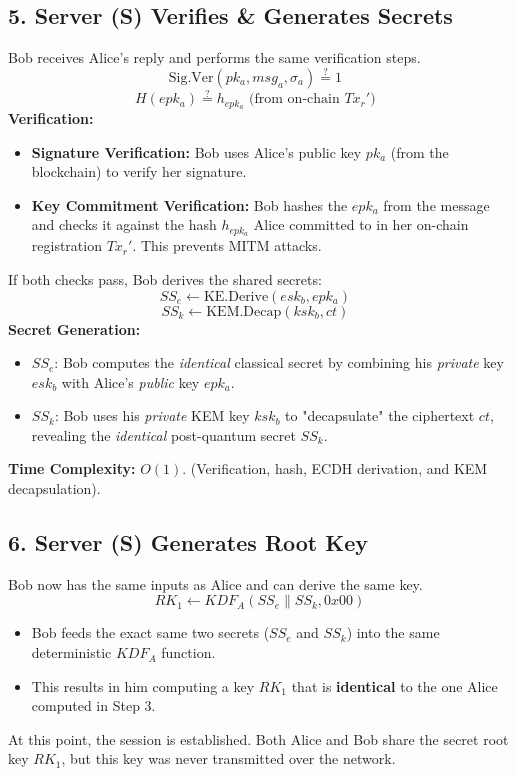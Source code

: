 \documentclass[12pt]{article}
\begin{document}
\subsection*{5. Server (S) Verifies \& Generates Secrets}
Bob receives Alice's reply and performs the same verification steps.
\[
\text{Sig.Ver}(pk_a, msg_a, \sigma_a) \stackrel{?}{=} 1 \text{ }
\]
\[
H(epk_a) \stackrel?{=} h_{epk_a} \text{ (from on-chain } Tx_r') \text{ }
\]
\textbf{Verification:}
\begin{itemize}
    \item \textbf{Signature Verification:} Bob uses Alice's public key \(pk_a\) (from the blockchain) to verify her signature.
    \item \textbf{Key Commitment Verification:} Bob hashes the \(epk_a\) from the message and checks it against the hash \(h_{epk_a}\) Alice committed to in her on-chain registration \(Tx_r'\). This prevents MITM attacks.
\end{itemize}
If both checks pass, Bob derives the shared secrets:
\[
SS_e \leftarrow \text{KE.Derive}(esk_b, epk_a) \text{ }
\]
\[
SS_k \leftarrow \text{KEM.Decap}(ksk_b, ct) \text{ }
\]
\textbf{Secret Generation:}
\begin{itemize}
    \item \textbf{\(SS_e\)}: Bob computes the \textit{identical} classical secret by combining his \textit{private} key \(esk_b\) with Alice's \textit{public} key \(epk_a\).
    \item \textbf{\(SS_k\)}: Bob uses his \textit{private} KEM key \(ksk_b\) to "decapsulate" the ciphertext \(ct\), revealing the \textit{identical} post-quantum secret \(SS_k\).
\end{itemize}
\textbf{Time Complexity:} \( O(1) \). (Verification, hash, ECDH derivation, and KEM decapsulation).

\subsection*{6. Server (S) Generates Root Key}
Bob now has the same inputs as Alice and can derive the same key.
\[
RK_1 \leftarrow KDF_A(SS_e \parallel SS_k, 0x00)
\]
\begin{itemize}
    \item Bob feeds the exact same two secrets (\(SS_e\) and \(SS_k\)) into the same deterministic \(KDF_A\) function.
    \item This results in him computing a key \(RK_1\) that is \textbf{identical} to the one Alice computed in Step 3.
\end{itemize}
At this point, the session is established. Both Alice and Bob share the secret root key \(RK_1\), but this key was never transmitted over the network.
\end{document}
